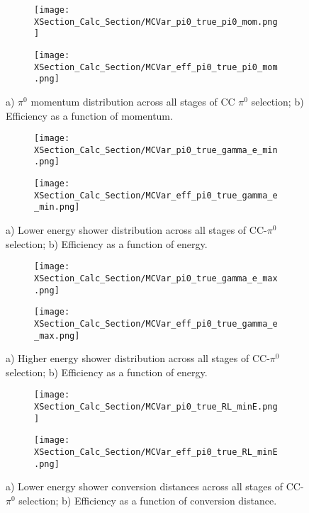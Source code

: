 \begin{figure}[H]
  \begin{subfigure}[t]{0.35\textwidth}
\texttt{[image: XSection\_Calc\_Section/MCVar\_pi0\_true\_pi0\_mom.png]}
  \caption{ }
  \end{subfigure} 
  \hspace{15mm}
  \begin{subfigure}[t]{0.35\textwidth}
\texttt{[image: XSection\_Calc\_Section/MCVar\_eff\_pi0\_true\_pi0\_mom.png]}
  \caption{ }
  \end{subfigure} 
\caption{a) $\pi^0$ momentum distribution across all stages of CC $\pi^0$ selection; b) Efficiency as a function of momentum. }
\label{fig:pi0_effs_1}
\end{figure}

\begin{figure}[H]
  \begin{subfigure}[t]{0.35\textwidth}
\texttt{[image: XSection\_Calc\_Section/MCVar\_pi0\_true\_gamma\_e\_min.png]}
  \caption{ }
  \end{subfigure} 
  \hspace{15mm}
  \begin{subfigure}[t]{0.35\textwidth}
\texttt{[image: XSection\_Calc\_Section/MCVar\_eff\_pi0\_true\_gamma\_e\_min.png]}
  \caption{ }
  \end{subfigure} 
\caption{a) Lower energy shower distribution across all stages of CC-$\pi^0$ selection; b) Efficiency as a function of energy. }
\label{fig:pi0_effs_2}
\end{figure}

\begin{figure}[H]
  \begin{subfigure}[t]{0.35\textwidth}
\texttt{[image: XSection\_Calc\_Section/MCVar\_pi0\_true\_gamma\_e\_max.png]}
  \caption{ }
  \end{subfigure} 
  \hspace{15mm}
  \begin{subfigure}[t]{0.35\textwidth}
\texttt{[image: XSection\_Calc\_Section/MCVar\_eff\_pi0\_true\_gamma\_e\_max.png]}
  \caption{ }
  \end{subfigure} 
\caption{a) Higher energy shower distribution across all stages of CC-$\pi^0$ selection; b) Efficiency as a function of energy. }
\label{fig:pi0_effs_3}
\end{figure}

\begin{figure}[H]
  \begin{subfigure}[t]{0.35\textwidth}
\texttt{[image: XSection\_Calc\_Section/MCVar\_pi0\_true\_RL\_minE.png]}
  \caption{ }
  \end{subfigure} 
  \hspace{15mm}
  \begin{subfigure}[t]{0.35\textwidth}
\texttt{[image: XSection\_Calc\_Section/MCVar\_eff\_pi0\_true\_RL\_minE.png]}
  \caption{ }
  \end{subfigure} 
\caption{a) Lower energy shower conversion distances across all stages of CC-$\pi^0$ selection; b) Efficiency as a function of conversion distance. }
\label{fig:pi0_effs_4}
\end{figure}

